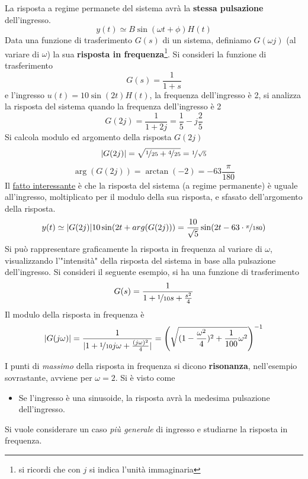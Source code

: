 \documentclass[10pt, letterpaper]{report}
\begin{document}
La risposta a regime permanete del sistema avrà la \textbf{stessa pulsazione} dell'ingresso.
$$y(t)\simeq B\sin(\omega t+\phi)H(t) $$
Data una funzione di trasferimento $G(s)$ di un sistema, definiamo $G(\omega j)$ (al variare di $\omega$) la sua \textbf{risposta in frequenza}\footnote{si ricordi che con $j$ si indica l'unità immaginaria}.\acc 
Si consideri la funzione di trasferimento $$ 
G(s)=\frac{1}{1+s}$$
e l'ingresso $u(t)=10\sin(2t)H(t)$, la frequenza dell'ingresso è 2, si analizza la risposta del sistema quando la frequenza dell'ingresso è 2
$$ G(2j)=\frac{1}{1+2j}=\frac{1}{5}-j\frac{2}{5}$$ 
Si calcola modulo ed argomento della risposta $G(2j)$
$$ |G(2j)|=\sqrt{\nicefrac{1}{25}+\nicefrac{4}{25}}=\nicefrac{1}{\sqrt{5}}$$
$$ \arg(G(2j))=\arctan(-2)=-63\frac{\pi}{180}$$
Il \underline{fatto interessante} è che la risposta del sistema (a regime permanente) è uguale all'ingresso, moltiplicato per il modulo della sua risposta, e sfasato dell'argomento della risposta. 
$$ y(t)\simeq |G(2j)|10\sin(2t+arg(G(2j)))=
\frac{10}{\sqrt{5}}\sin(2t-63\cdot \nicefrac{\pi}{180})$$
Si può rappresentare graficamente la risposta in frequenza al variare di $\omega$, visualizzando l'"intensità" della risposta del sistema in base alla pulsazione dell'ingresso.\acc 
Si consideri il seguente esempio, si ha una 
funzione di trasferimento 
$$ G(s)=\frac{1}{1+\nicefrac{1}{10}s+\frac{s^2}{4}}$$
Il modulo della risposta in frequenza è 
$$ |G(j\omega)|=\frac{1}{|1+\nicefrac{1}{10}j\omega+\frac{(j\omega)^2}{4}|}=\Bigg(
\sqrt{(1-\frac{\omega^2}{4})^2+\frac{1}{100}\omega^2}    
\Bigg)^{-1}$$
\begin{center}
    \begin{figure}[h!]
        \centering
\end{figure}
\end{center}
I punti di \textit{massimo} della risposta in frequenza si dicono \textbf{risonanza}, nell'esempio sovrastante, avviene per $\omega=2$.\acc 
Si è visto come \begin{itemize}
    \item Se l'ingresso è una sinusoide, la risposta avrà la medesima pulsazione dell'ingresso.
\end{itemize}
Si vuole considerare un caso \textit{più generale} di ingresso e studiarne la risposta in frequenza.
\end{document}
